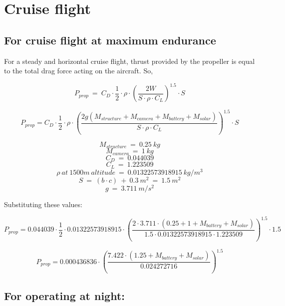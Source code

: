 
\chapter{Cruise flight}
\label{chap: Cruise Flight}

\section{For cruise flight at maximum endurance}

\p For a steady and horizontal cruise flight, thrust provided by the propeller is equal to the total drag force acting on the aircraft. So,




\[
P_{prop} \ = \  C_D \cdot \frac{1}{2} \cdot \rho \cdot \left(\frac{2W}{S \cdot \rho \cdot C_L }\right)^{1.5} \cdot S
\]



\[
P_{prop} = C_D \cdot \frac{1}{2} \cdot \rho \cdot \left(\frac{2g(M_{structure} + M_{camera} + M_{battery} + M_{solar})}{S \cdot \rho \cdot C_L} \right)^{1.5} \cdot S
\]

\[ M_{structure} \ = \ 0.25 \ kg \]
\[ M_{camera} \ = \ 1 \ kg \]
\[ C_D \ = \ 0.044039 \]
\[ C_L \ = \ 1.223509 \]
\[ \rho \ at \ 1500m \ altitude \ = \ 0.01322573918915 \ kg/m^3 \]
\[S \ = \ ( b \cdot c ) \ + \ 0.3 \ m^2 \ = \ 1.5 \ m^2\]
\[g \ = \ 3.711 \ m/s^2 \]

Substituting these values:

\[
P_{prop} = 0.044039 \cdot \frac{1}{2} \cdot 0.01322573918915 \cdot \left(\frac{2 \cdot 3.711 \cdot (0.25 + 1 + M_{battery} + M_{solar})}{1.5 \cdot 0.01322573918915 \cdot 1.223509} \right)^{1.5} \cdot 1.5
\]


\[
P_{prop} = 0.000436836 \cdot \left(\frac{7.422 \cdot (1.25 + M_{battery} + M_{solar})}{ 0.024272716 } \right)^{1.5}
\]






\section{For operating at night:}

